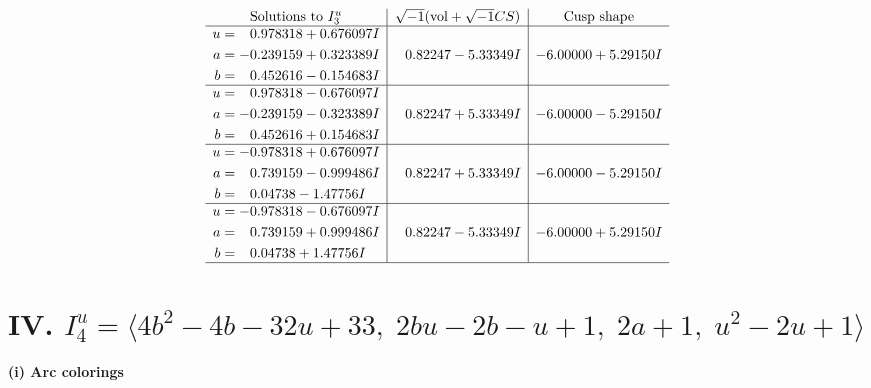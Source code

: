 \documentclass[1p]{elsarticle_modified}
\theoremstyle{definition}
\newcommand{\I}{\sqrt{-1}}
\begin{document}
$$\begin{array}{c|c|c}  
\text{Solutions to }I^u_{3}& \I (\text{vol} + \sqrt{-1}CS) & \text{Cusp shape}\\
 \hline 
\begin{aligned}
u &= \phantom{-}0.978318 + 0.676097 I \\
a &= -0.239159 + 0.323389 I \\
b &= \phantom{-}0.452616 - 0.154683 I\end{aligned}
 & \phantom{-}0.82247 - 5.33349 I & -6.00000 + 5.29150 I \\ \hline\begin{aligned}
u &= \phantom{-}0.978318 - 0.676097 I \\
a &= -0.239159 - 0.323389 I \\
b &= \phantom{-}0.452616 + 0.154683 I\end{aligned}
 & \phantom{-}0.82247 + 5.33349 I & -6.00000 - 5.29150 I \\ \hline\begin{aligned}
u &= -0.978318 + 0.676097 I \\
a &= \phantom{-}0.739159 - 0.999486 I \\
b &= \phantom{-}0.04738 - 1.47756 I\end{aligned}
 & \phantom{-}0.82247 + 5.33349 I & -6.00000 - 5.29150 I \\ \hline\begin{aligned}
u &= -0.978318 - 0.676097 I \\
a &= \phantom{-}0.739159 + 0.999486 I \\
b &= \phantom{-}0.04738 + 1.47756 I\end{aligned}
 & \phantom{-}0.82247 - 5.33349 I & -6.00000 + 5.29150 I\\
 \hline 
 \end{array}$$\newpage\newpage\renewcommand{\arraystretch}{1}
\centering \section*{IV. $I^u_{4}= \langle 4 b^2-4 b-32 u+33,\;2 b u-2 b- u+1,\;2 a+1,\;u^2-2 u+1 \rangle$}
\flushleft \textbf{(i) Arc colorings}\\
\end{document}

